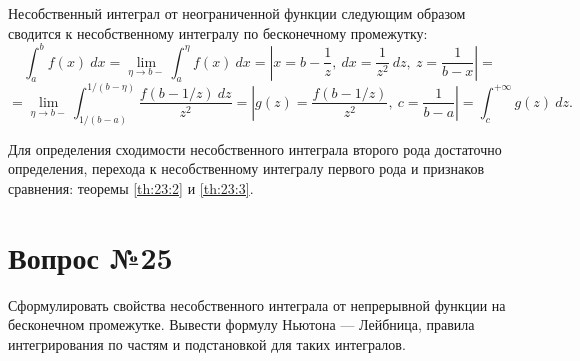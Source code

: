 \documentclass[12pt]{report}
\numberwithin{equation}{section}
\begin{document}
Несобственный интеграл от неограниченной функции следующим образом сводится к несобственному интегралу по бесконечному промежутку:
\[ \int_a^b f(x)~dx = \lim_{\eta \to b-} \int_a^{\eta} f(x)~dx = \left| x = b - \frac{1}{z},~ dx = \frac{1}{z^2}~dz,~z = \frac{1}{b-x} \right| = \]
\[ = \lim_{\eta \to b-} \int_{1 / (b-a)}^{1/(b-\eta)} \frac{f(b-1/z)~dz}{z^2} = \left| g(z) = \frac{f(b-1/z)}{z^2},~c = \frac{1}{b-a} \right| = \int_c^{+\infty} g(z)~dz.\]

Для определения сходимости несобственного интеграла второго рода достаточно определения, перехода к несобственному интегралу первого рода и признаков сравнения: теоремы \ref{th:23:2} и \ref{th:23:3}.

\newpage \section{Вопрос №25} %
\begin{framed}
Сформулировать свойства несобственного интеграла от непрерывной функции на бесконечном промежутке. Вывести формулу Ньютона --- Лейбница, правила интегрирования по частям и подстановкой для таких интегралов.
\end{framed}
\end{document}
